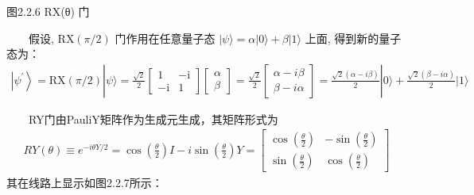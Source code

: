 \documentclass[a4paper,11pt,english]{sphinxmanual}
\begin{document}
\begin{center}图2.2.6 RX(θ) 门
\end{center}
\sphinxAtStartPar
  假设,  \(\mathrm{RX}(\pi / 2)\) 门作用在任意量子态  \(|\psi\rangle=\alpha|0\rangle+\beta|1\rangle\) 上面, 得到新的量子态为：
\begin{equation*}
\begin{split}\left|\psi^{\prime}\right\rangle=\mathrm{RX}(\pi / 2)|\psi\rangle=\frac{\sqrt{2}}{2}\left[\begin{array}{rr} 1 & -\mathrm{i} \\ -\mathrm{i} & 1 \end{array}\right]\left[\begin{array}{l} \alpha \\ \beta \end{array}\right]=\frac{\sqrt{2}}{2}\left[\begin{array}{l} \alpha-i \beta \\ \beta-i \alpha \end{array}\right]=\frac{\sqrt{2}(\alpha-i \beta)}{2}|0\rangle+\frac{\sqrt{2}(\beta-i \alpha)}{2}|1\rangle\end{split}
\end{equation*}
\sphinxAtStartPar
{}

\sphinxAtStartPar
  RY门由Pauli\sphinxhyphen{}Y矩阵作为生成元生成，其矩阵形式为
\begin{equation*}
\begin{split}RY(\theta) \equiv e^{-i \theta Y / 2}=\cos \left(\frac{\theta}{2}\right) I-i \sin \left(\frac{\theta}{2}\right) Y=\left[\begin{array}{cc} \cos \left(\frac{\theta}{2}\right) & -\sin \left(\frac{\theta}{2}\right) \\ \sin \left(\frac{\theta}{2}\right) & \cos \left(\frac{\theta}{2}\right) \end{array}\right]\end{split}
\end{equation*}
\sphinxAtStartPar
其在线路上显示如图2.2.7所示：

\end{document}
